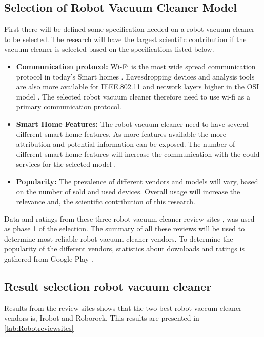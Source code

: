 \subsection{Selection of Robot Vacuum Cleaner Model}
First there will be defined some specification needed on a robot vacuum cleaner to be selected. The research will have the largest scientific contribution if the vacuum cleaner is selected based on the specifications listed below.
\begin{itemize}
    \item \textbf{Communication protocol:} Wi-Fi is the most wide spread communication protocol in today's Smart homes \cite{robotsel1}. Eavesdropping devices and analysis tools are also more available for IEEE.802.11 and network layers higher in the OSI model \cite{osimodel}. The selected robot vacuum cleaner therefore need to use wi-fi as a primary communication protocol.
    
    \item \textbf{Smart Home Features:} The robot vacuum cleaner need to have several different smart home features. As more features available the more attribution and potential information can be exposed. The number of different smart home features will increase the communication with the could services for the selected model \cite{robotsel4}.
    
    \item \textbf{Popularity:} The prevalence of different vendors and models will vary, based on the number of sold and used devices. Overall usage will increase the relevance and, the scientific contribution of this research.  
\end{itemize}

Data and ratings from these three robot vacuum cleaner review sites \cite{robotsel11}\cite{robotsel12}\cite{robotsel13}, was used  as phase 1 of the selection. The summary of all these reviews will be used to determine most reliable robot vacuum cleaner vendors. To determine the popularity of the different vendors, statistics about downloads and ratings is gathered from Google Play \cite{GooglePlay}.

\subsection{Result selection robot vacuum cleaner}

Results from the review sites shows that the two best robot vaccum cleaner vendors is, Irobot and Roborock. This results are presented in \ref{tab:Robotreviewsites}

